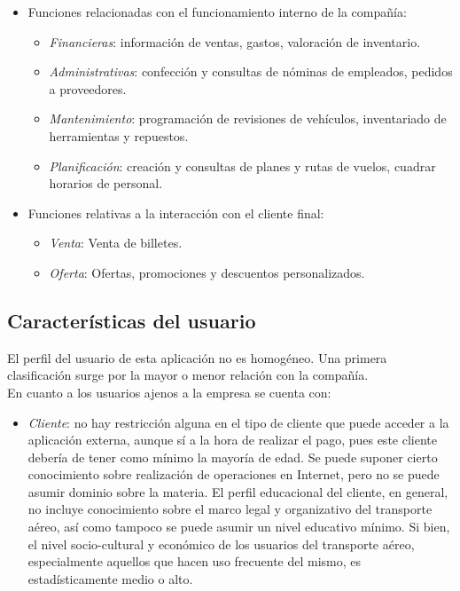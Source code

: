 \documentclass[11pt, a4paper, twoside]{report}
\begin{document}
			\begin{itemize}
				\item Funciones relacionadas con el funcionamiento interno de la compañía:
					\begin{itemize}
						\item \textit{Financieras}: información de ventas, gastos, valoración de inventario.
						\item \textit{Administrativas}: confección y consultas de nóminas de empleados, pedidos a proveedores.
						\item \textit{Mantenimiento}: programación de revisiones de vehículos, inventariado de herramientas y repuestos.
						\item \textit{Planificación}: creación y consultas de planes y rutas de vuelos, cuadrar horarios de personal.			
					\end{itemize}
				\item Funciones relativas a la interacción con el cliente final:
					\begin{itemize}
						\item \textit{Venta}: Venta de billetes.
						\item \textit{Oferta}: Ofertas, promociones y descuentos personalizados.
					\end{itemize}
			\end{itemize}
			
		\subsection{Características del usuario}
			El perfil del usuario de esta aplicación no es homogéneo. Una primera clasificación surge por la mayor o menor relación con la compañía.\\
			En cuanto a los usuarios ajenos a la empresa se cuenta con:
	
			\begin{itemize}
				\item \textit{Cliente}: no hay restricción alguna en el tipo de cliente que puede acceder a la aplicación externa, aunque sí a la hora de realizar el pago, pues este cliente debería de tener como mínimo la mayoría de edad. Se puede suponer cierto conocimiento sobre realización de operaciones en \gls{Internet}, pero no se puede asumir dominio sobre la materia. El perfil educacional del cliente, en general, no incluye conocimiento sobre el marco legal y organizativo del transporte aéreo, así como tampoco se puede asumir un nivel educativo mínimo. Si bien, el nivel socio-cultural y económico de los usuarios del transporte aéreo, especialmente aquellos que hacen uso frecuente del mismo, es estadísticamente medio o alto.
			\end{itemize}
\end{document}
